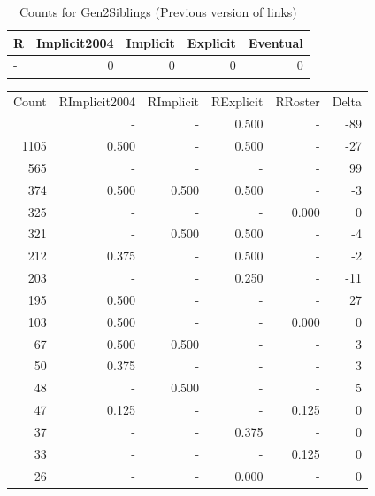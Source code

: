 \documentclass[a4paper]{article}\usepackage{graphicx, color}
\begin{document}
\begin{table}[ht]
\centering
{\large
\begin{tabular}{lrrrr}
  \hline
R & Implicit2004 & Implicit & Explicit & Eventual \\ 
  \hline
- &   0 &   0 &   0 &   0 \\ 
   \hline
\end{tabular}
}
\caption{Counts for Gen2Siblings (Previous version of links)} 
\end{table}



\begin{table}[ht]
\centering
\begin{tabular}{rrrrrr}
  \hline
Count & RImplicit2004 & RImplicit & RExplicit & RRoster & Delta \\ 
  \rowcolor{sosoColor}  \hline
1383 & - & - & 0.500 & - & -89 \\ 
   \rowcolor{sosoColor} 1105 & 0.500 & - & 0.500 & - & -27 \\ 
   \rowcolor{nullColor} 565 & - & - & - & - & 99 \\ 
   \rowcolor{goodColor} 374 & 0.500 & 0.500 & 0.500 & - & -3 \\ 
   \rowcolor{nullColor} 325 & - & - & - & 0.000 & 0 \\ 
   \rowcolor{goodColor} 321 & - & 0.500 & 0.500 & - & -4 \\ 
   \rowcolor{sosoColor} 212 & 0.375 & - & 0.500 & - & -2 \\ 
   \rowcolor{sosoColor} 203 & - & - & 0.250 & - & -11 \\ 
   \rowcolor{nullColor} 195 & 0.500 & - & - & - & 27 \\ 
   \rowcolor{nullColor} 103 & 0.500 & - & - & 0.000 & 0 \\ 
  67 & 0.500 & 0.500 & - & - & 3 \\ 
   \rowcolor{nullColor} 50 & 0.375 & - & - & - & 3 \\ 
  48 & - & 0.500 & - & - & 5 \\ 
   \rowcolor{nullColor} 47 & 0.125 & - & - & 0.125 & 0 \\ 
   \rowcolor{sosoColor} 37 & - & - & 0.375 & - & 0 \\ 
   \rowcolor{nullColor} 33 & - & - & - & 0.125 & 0 \\ 
   \rowcolor{sosoColor} 26 & - & - & 0.000 & - & 0 \\ 

\end{tabular}
\end{table}
\end{document}
